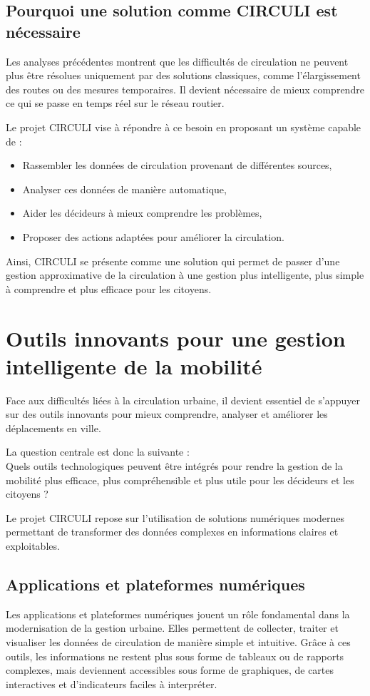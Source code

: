 \subsection{Pourquoi une solution comme CIRCULI est nécessaire}

Les analyses précédentes montrent que les difficultés de circulation ne peuvent plus être résolues uniquement par des solutions classiques, comme l'élargissement des routes ou des mesures temporaires. Il devient nécessaire de mieux comprendre ce qui se passe en temps réel sur le réseau routier.

Le projet CIRCULI vise à répondre à ce besoin en proposant un système capable de :
\begin{itemize}
    \item Rassembler les données de circulation provenant de différentes sources,
    \item Analyser ces données de manière automatique,
    \item Aider les décideurs à mieux comprendre les problèmes,
    \item Proposer des actions adaptées pour améliorer la circulation.
\end{itemize}

Ainsi, CIRCULI se présente comme une solution qui permet de passer d'une gestion approximative de la circulation à une gestion plus intelligente, plus simple à comprendre et plus efficace pour les citoyens.

\section{Outils innovants pour une gestion intelligente de la mobilité}
Face aux difficultés liées à la circulation urbaine, il devient essentiel de s'appuyer sur des outils innovants pour mieux comprendre, analyser et améliorer les déplacements en ville.

La question centrale est donc la suivante :\\
Quels outils technologiques peuvent être intégrés pour rendre la gestion de la mobilité plus efficace, plus compréhensible et plus utile pour les décideurs et les citoyens ?

Le projet CIRCULI repose sur l'utilisation de solutions numériques modernes permettant de transformer des données complexes en informations claires et exploitables.

\subsection{Applications et plateformes numériques}
Les applications et plateformes numériques jouent un rôle fondamental dans la modernisation de la gestion urbaine. Elles permettent de collecter, traiter et visualiser les données de circulation de manière simple et intuitive. Grâce à ces outils, les informations ne restent plus sous forme de tableaux ou de rapports complexes, mais deviennent accessibles sous forme de graphiques, de cartes interactives et d'indicateurs faciles à interpréter.

